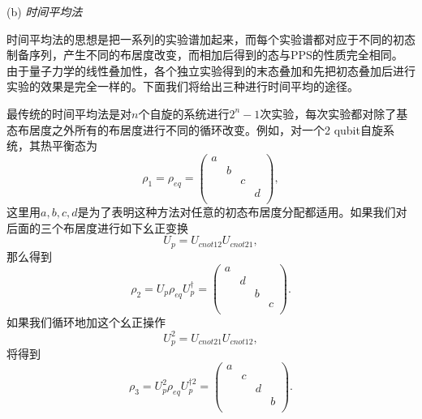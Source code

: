 (b) \emph{时间平均法}

时间平均法的思想是把一系列的实验谱加起来，而每个实验谱都对应于不同的初态制备序列，产生不同的布居度改变，而相加后得到的态与PPS的性质完全相同。
由于量子力学的线性叠加性，各个独立实验得到的末态叠加和先把初态叠加后进行实验的效果是完全一样的。下面我们将给出三种进行时间平均的途径。

最传统的时间平均法是对$n$个自旋的系统进行$2^n-1$次实验，每次实验都对除了基态布居度之外所有的布居度进行不同的循环改变。例如，对一个2 qubit自旋系统，其热平衡态为
\begin{equation}\label{aaa}
\rho_1 = \rho_{eq} =\left(
                      \begin{array}{cccc}
                        a &   &   &   \\
                          & b &   &   \\
                          &   & c &   \\
                          &   &   & d \\
                      \end{array}
                    \right),
\end{equation}
这里用$a, b, c, d$是为了表明这种方法对任意的初态布居度分配都适用。如果我们对后面的三个布居度进行如下幺正变换
 \begin{equation}\label{aaa}
U_p = U_{cnot12}U_{cnot21},
\end{equation}
那么得到
\begin{equation}\label{aaa}
\rho_2 = U_p\rho_{eq}U_p^{\dagger} =\left(
                      \begin{array}{cccc}
                        a &   &   &   \\
                          & d &   &   \\
                          &   & b &   \\
                          &   &   & c \\
                      \end{array}
                    \right).
\end{equation}
如果我们循环地加这个幺正操作
\begin{equation}\label{aaa}
U_p^2 = U_{cnot21}U_{cnot12},
\end{equation}
将得到
\begin{equation}\label{aaa}
\rho_3 = U_p^2\rho_{eq}U_p^{\dagger2} =\left(
                      \begin{array}{cccc}
                        a &   &   &   \\
                          & c &   &   \\
                          &   & d &   \\
                          &   &   & b \\
                      \end{array}
                    \right).
\end{equation}
